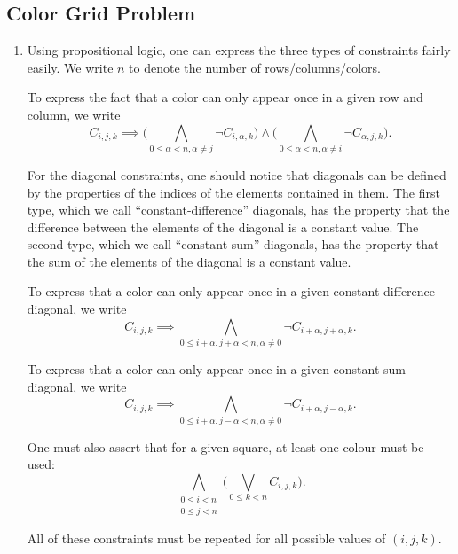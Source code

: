 \documentclass[journal,onecolumn]{IEEEtran}
\begin{document}
\subsection{Color Grid Problem}
\begin{enumerate}
	\item Using propositional logic, one can express the three types of constraints fairly easily.
	We write \(n\) to denote the number of rows/columns/colors.
	
	To express the fact that a color can only appear once in a given row and column, we write
	\[
	C_{i, j, k} \implies \Bigg(\bigwedge_{0 \le \alpha < n, \alpha \ne j} \lnot C_{i, \alpha, k}\Bigg) \land \Bigg(\bigwedge_{0 \le \alpha < n, \alpha \ne i} \lnot C_{\alpha, j, k}\Bigg).
	\]
	
	For the diagonal constraints, one should notice that diagonals can be defined by the properties of the indices of the elements contained in them.
	The first type, which we call ``constant-difference'' diagonals, has the property that the difference between the elements of the diagonal is a constant value.
	The second type, which we call ``constant-sum'' diagonals, has the property that the sum of the elements of the diagonal is a constant value.
	
	To express that a color can only appear once in a given constant-difference diagonal, we write
	\[
	C_{i, j, k} \implies \bigwedge_{0 \le i+\alpha, j+\alpha < n, \alpha \ne 0} \lnot C_{i+\alpha, j+\alpha, k}.
	\]
	
	To express that a color can only appear once in a given constant-sum diagonal, we write
	\[
	C_{i, j, k} \implies \bigwedge_{0 \le i+\alpha, j-\alpha < n, \alpha \ne 0} \lnot C_{i+\alpha, j-\alpha, k}.
	\]
	
	One must also assert that for a given square, at least one colour must be used:
	\[
	\bigwedge_{\substack{0 \le i < n \\ 0 \le j < n}} \Bigg(\bigvee_{0 \le k < n} C_{i, j, k}\Bigg).
	\]
	
	All of these constraints must be repeated for all possible values of \((i, j, k)\).
	

\end{enumerate}
\end{document}
